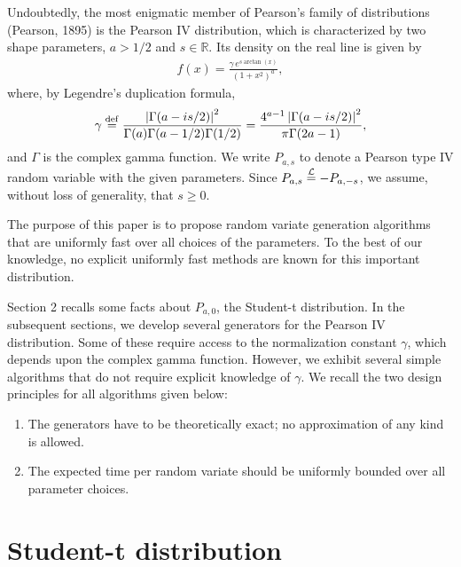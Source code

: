 \documentclass[12pt,reqno,tbtags]{amsart}
\newcommand{\inlaw}{\buildrel {\mathcal L} \over =}
\newcommand{\RR}{\mathbb{R}}
\newcommand{\isdef}{\buildrel {\rm def} \over =}
\begin{document}
Undoubtedly, the most enigmatic member of Pearson's family of distributions (Pearson, 1895)\cite{Pea}
is the Pearson IV distribution, which is characterized by two
shape parameters, $a > 1/2$ and $s \in \RR$.  Its density on the real line
is given by
\begin{align}
\label{pearsonIV}
f(x) = \frac {\gamma \, e^{s \arctan (x)} }{ (1+x^2)^a},
\end{align}
where, by Legendre's duplication formula,
$$
\gamma 
\isdef  \frac { \left|  \Gamma (a - is/2) \right|^2  }{ \Gamma (a) \Gamma (a -1/2) \Gamma (1/2) }
= \frac { 4^{a-1} \left|  \Gamma (a - is/2) \right|^2  }{ \pi \Gamma (2a-1) },
$$
and $\Gamma$ is the complex gamma function.
We write $P_{a, s}$ to denote a Pearson type IV random variable with the given
parameters. 
Since $P_{a, s} \inlaw - P_{a, -s}$, we assume, without loss of generality, that $s \ge 0$.

The purpose of this paper is to propose random
variate generation algorithms that are uniformly fast over all choices of the parameters.
To the best of our knowledge, no explicit uniformly fast methods are known for this important distribution.

Section 2 recalls some facts about $P_{a,0}$, the Student-t distribution.
In the subsequent sections, we develop several generators
for the Pearson IV distribution. Some of these
require access to the normalization constant $\gamma$, which depends upon the complex gamma function.
However, we exhibit several simple algorithms that do not require explicit knowledge of $\gamma$.
We recall the two design principles for all algorithms given below:

\begin{enumerate}
\item[(i)] The generators have to be theoretically exact; no approximation of any kind is allowed.
\item[(ii)] The expected time per random variate should be uniformly bounded over all parameter choices.
\end{enumerate}

\medskip




\section{Student-t distribution}\label{Student}
\end{document}
